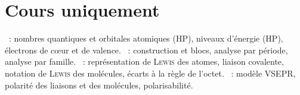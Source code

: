 \documentclass[a4paper, 12pt, final, garamond]{book}
\begin{document}
\section{Cours uniquement}
\begin{enumerate}[label=\Roman*]
	~: nombres quantiques et
	orbitales atomiques (HP), niveaux d'énergie (HP), électrons de cœur et de
	valence.
	~: construction et blocs, analyse par période,
	analyse par famille.
	~: représentation de
	\textsc{Lewis} des atomes, liaison covalente, notation de \textsc{Lewis}
	des molécules, écarts à la règle de l'octet.
	~: modèle VSEPR, polarité
	des liaisons et des molécules, polarisabilité.
\end{enumerate}


\newpage
\end{document}
